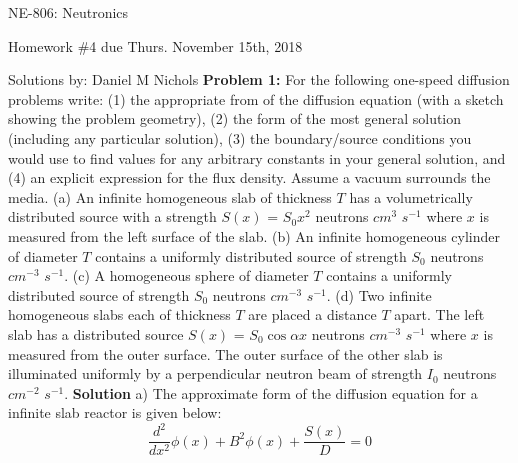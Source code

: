 \documentclass{amsart}
\theoremstyle{definition}
\begin{document}
\LARGE{NE-806: Neutronics}
 
\large
Homework \#4 due Thurs. November 15th, 2018
 
Solutions by: Daniel M Nichols
\newline
\bigskip
\textbf{Problem 1:} \newline For the following one-speed diffusion problems write: (1) the appropriate from of the diffusion equation (with a sketch showing the problem geometry), (2) the form of the most general solution (including any particular solution), (3) the boundary/source conditions you would use to find values for any arbitrary constants in your general solution, and (4) an explicit expression for the flux density. Assume a vacuum surrounds the media.
\bigbreak
(a) An infinite homogeneous slab of thickness $T$ has a volumetrically distributed source with a strength $S(x)$ = $S_0x^2$ neutrons $cm^3$ $s^{-1}$ where $x$ is measured from the left surface of the slab.\newline
\bigbreak
(b) An infinite homogeneous cylinder of diameter $T$ contains a uniformly distributed source of strength $S_0$ neutrons $cm^{-3}$ $s^{-1}$.\newline
\bigbreak
(c) A homogeneous sphere of diameter $T$ contains a uniformly distributed source of strength $S_0$ neutrons $cm^{-3}$ $s^{-1}$.\newline
\bigbreak
(d) Two infinite homogeneous slabs each of thickness $T$ are placed a distance $T$ apart. The left slab has a distributed source $S(x)$ = $S_0\cos \alpha x$ neutrons $cm^{-3}$ $s^{-1}$ where $x$ is measured from the outer surface. The outer surface of the other slab is illuminated uniformly by a perpendicular neutron beam of strength $I_0$ neutrons $cm^{-2}$ $s^{-1}$.\newline
\bigbreak
\newpage
\textbf{Solution}
\bigbreak
a) The approximate form of the diffusion equation for a infinite slab reactor is given below:
\bigbreak
\begin{equation*}
    \frac{d^2}{dx^2}\phi(x) + B^2\phi(x) + \frac{S(x)}{D} = 0
\end{equation*}
 
\end{document}
